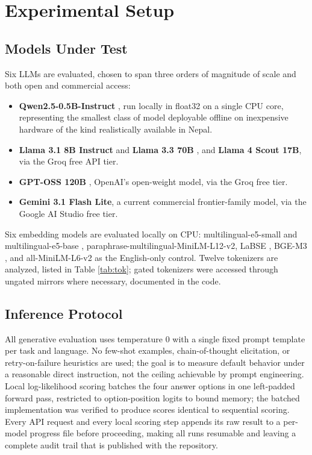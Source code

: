 \documentclass[conference]{IEEEtran}
\begin{document}
\section{Experimental Setup}
\subsection{Models Under Test}
Six LLMs are evaluated, chosen to span three orders of magnitude of scale and both open and commercial access:
\begin{itemize}
\item \textbf{Qwen2.5-0.5B-Instruct} \cite{qwen2025}, run locally in float32 on a single CPU core, representing the smallest class of model deployable offline on inexpensive hardware of the kind realistically available in Nepal.
\item \textbf{Llama 3.1 8B Instruct} and \textbf{Llama 3.3 70B} \cite{grattafiori2024llama}, and \textbf{Llama 4 Scout 17B}, via the Groq free API tier.
\item \textbf{GPT-OSS 120B} \cite{openai2025gptoss}, OpenAI's open-weight model, via the Groq free tier.
\item \textbf{Gemini 3.1 Flash Lite}, a current commercial frontier-family model, via the Google AI Studio free tier.
\end{itemize}
Six embedding models are evaluated locally on CPU: multilingual-e5-small and multilingual-e5-base \cite{wang2024e5}, paraphrase-multilingual-MiniLM-L12-v2, LaBSE \cite{feng2022labse}, BGE-M3 \cite{chen2024bgem3}, and all-MiniLM-L6-v2 as the English-only control. Twelve tokenizers are analyzed, listed in Table \ref{tab:tok}; gated tokenizers were accessed through ungated mirrors where necessary, documented in the code.

\subsection{Inference Protocol}
All generative evaluation uses temperature 0 with a single fixed prompt template per task and language. No few-shot examples, chain-of-thought elicitation, or retry-on-failure heuristics are used; the goal is to measure default behavior under a reasonable direct instruction, not the ceiling achievable by prompt engineering. Local log-likelihood scoring batches the four answer options in one left-padded forward pass, restricted to option-position logits to bound memory; the batched implementation was verified to produce scores identical to sequential scoring. Every API request and every local scoring step appends its raw result to a per-model progress file before proceeding, making all runs resumable and leaving a complete audit trail that is published with the repository.
\end{document}
